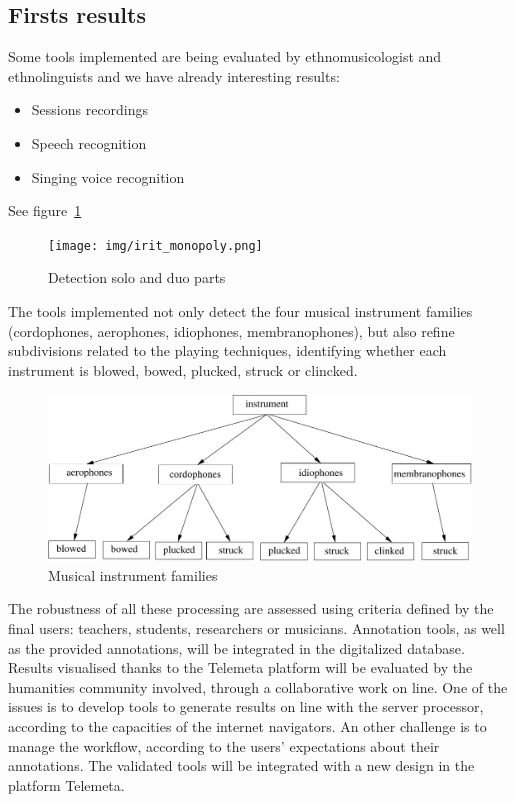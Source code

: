 \documentclass{sig-alternate}
\begin{document}
\subsection{Firsts results}

Some tools implemented are being evaluated by ethnomusicologist and ethnolinguists and we have already interesting results:

\begin{itemize}
\item Sessions recordings
\item Speech recognition
\item Singing voice recognition
\end{itemize}

See figure~\ref{fig:Monopoly}
\begin{figure}
  \centering
\texttt{[image: img/irit\_monopoly.png]} 
 \caption{Detection solo and duo parts}
  \label{fig:Monopoly}
\end{figure}


The tools implemented not only detect the four musical instrument families (cordophones, aerophones, idiophones, membranophones), but also refine subdivisions related to the playing techniques, identifying whether each instrument is blowed, bowed, plucked, struck or clincked.
\begin{figure}
  \centering
  \includegraphics[width=0.9\linewidth]{img/taxonomie_diadems.pdf}
  \caption{Musical instrument families}
  \label{fig:instruments}
\end{figure}

The robustness of all these processing are assessed using criteria defined by the final users: teachers, students, researchers or musicians. Annotation tools, as well as the provided annotations, will be integrated in the digitalized database. Results visualised thanks to the Telemeta platform will be evaluated by the humanities community involved, through a collaborative work on line. One of the issues is to develop tools to generate results on line with the server processor, according to the capacities of the internet navigators. An other challenge is to manage the workflow, according to the users' expectations about their annotations. The validated tools will be integrated with a new design in the platform Telemeta.
\end{document}
